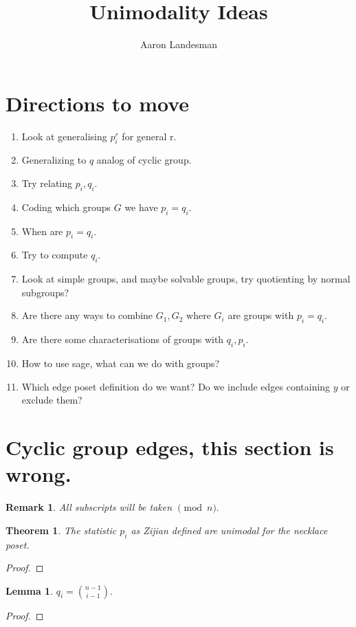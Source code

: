 \documentclass{amsart}
\title{Unimodality Ideas}
\author{Aaron Landesman}
\newtheorem{lem}[subsubsection]{Lemma}
\newtheorem{thm}[subsubsection]{Theorem}
\newtheorem{rem}[subsubsection]{Remark}
\begin{document}
\maketitle
\section{Directions to move}
\begin{enumerate}
	\item Look at generalising $p_i^r$ for general r.
	\item Generalizing to $q$ analog of cyclic group.
	\item Try relating $p_i,q_i.$
	\item Coding which groups $G$ we have $p_i=q_i.$
	\item When are $p_i = q_i.$
	\item Try to compute $q_i.$
	\item Look at simple groups, and maybe solvable groups, try quotienting by normal subgroups?
	\item Are there any ways to combine $G_1,G_2$ where $G_i$ are groups with $p_i = q_i.$
	\item Are there some characterisations of groups with $q_i,p_i.$
	\item How to use sage, what can we do with groups?
	\item Which edge poset definition do we want? Do we include edges containing $y$ or exclude them?
\end{enumerate}
\section{Cyclic group edges, this section is wrong.}
\begin{rem}
All subscripts will be taken $\pmod n.$
\end{rem}


\begin{thm}
The statistic $p_i$ as Zijian defined are unimodal for the necklace poset.
\end{thm}
\begin{proof}

\end{proof}

\begin{lem}
\label{q_i_count}
$q_i = \binom {n-1}{i-1}.$
\end{lem}
\begin{proof}

\end{proof}
\end{document}
